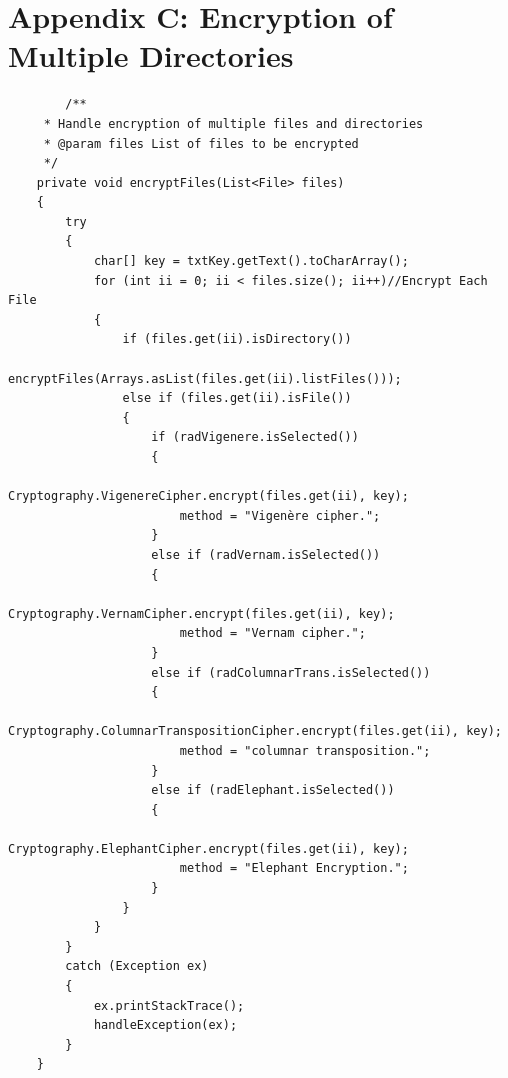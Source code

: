 \documentclass[11pt]{article}
\begin{document}
		\section*{Appendix C: Encryption of Multiple Directories}
    \begin{verbatim}
		/**
     * Handle encryption of multiple files and directories
     * @param files List of files to be encrypted
     */
    private void encryptFiles(List<File> files)
    {
        try
        {
            char[] key = txtKey.getText().toCharArray();
            for (int ii = 0; ii < files.size(); ii++)//Encrypt Each File
            {
                if (files.get(ii).isDirectory())
                    encryptFiles(Arrays.asList(files.get(ii).listFiles()));
                else if (files.get(ii).isFile())
                {
                    if (radVigenere.isSelected())
                    {
                        Cryptography.VigenereCipher.encrypt(files.get(ii), key);
                        method = "Vigenère cipher.";
                    }
                    else if (radVernam.isSelected())
                    {
                        Cryptography.VernamCipher.encrypt(files.get(ii), key);
                        method = "Vernam cipher.";
                    }
                    else if (radColumnarTrans.isSelected())
                    {
                        Cryptography.ColumnarTranspositionCipher.encrypt(files.get(ii), key);
                        method = "columnar transposition.";
                    }
                    else if (radElephant.isSelected())
                    {
                        Cryptography.ElephantCipher.encrypt(files.get(ii), key);
                        method = "Elephant Encryption.";
                    }
                }
            }
        }
        catch (Exception ex)
        {
            ex.printStackTrace();
            handleException(ex);
        }
    }
		\end{verbatim}
\end{document}
